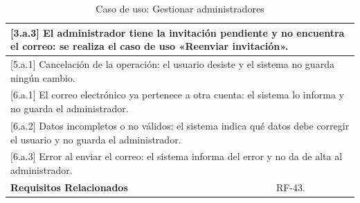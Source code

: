 \begin{table}[h!]
\begin{tabular}{|p{4cm}|p{11cm}|}
        \hline
        \multicolumn{2}{|p{15cm}|}{ [3.a.3] El administrador tiene la invitación pendiente y no encuentra el correo: se realiza el caso de uso «Reenviar invitación». } \\
        \hline
        \multicolumn{2}{|p{15cm}|}{ [5.a.1] Cancelación de la operación: el usuario desiste y el sistema no guarda ningún cambio. } \\
        \hline
        \multicolumn{2}{|p{15cm}|}{ [6.a.1] El correo electrónico ya pertenece a otra cuenta: el sistema lo informa y no guarda el administrador. } \\
        \hline
        \multicolumn{2}{|p{15cm}|}{ [6.a.2] Datos incompletos o no válidos: el sistema indica qué datos debe corregir el usuario y no guarda el administrador. } \\
        \hline
        \multicolumn{2}{|p{15cm}|}{ [6.a.3] Error al enviar el correo: el sistema informa del error y no da de alta al administrador. } \\
        \hline
        \textbf{Requisitos Relacionados} & RF-43. \\
        \hline
    \end{tabular}
    \caption{Caso de uso: Gestionar administradores}
\end{table}

